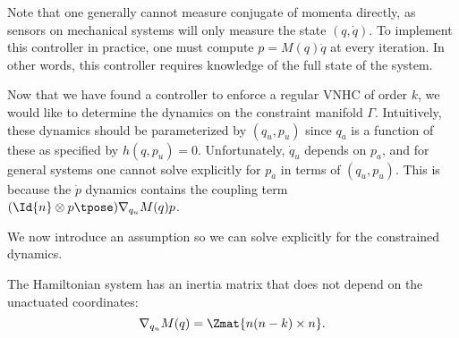 Note that one generally cannot measure conjugate of momenta directly, as sensors
on mechanical systems will only measure the state \((q,\dot{q})\). To
implement this controller in practice, one must compute \(p = M(q)\dot{q}\) at
every iteration. In other words, this controller requires knowledge of the full
state of the system.


Now that we have found a controller to enforce a regular VNHC of order \(k\), we
would like to determine the dynamics on the constraint manifold \(\Gamma\). 
Intuitively, these dynamics should be parameterized by \((q_u, p_u)\) since
\(q_a\) is a function of these as specified by \(h(q,p_u) = 0\).
Unfortunately, \(\dot{q}_u\) depends on \(p_a\), and for general systems one
cannot solve explicitly for \(p_a\) in terms of \((q_u,p_u)\). 
This is because the \(\dot{p}\) dynamics contains the coupling term 
\((\Id{n} \otimes p\tpose)\nabla_{q_u}M(q)p\). 

We now introduce an assumption so we can solve explicitly for the constrained
dynamics.

\begin{assm}\label{assm:inertially-actuated}
    The Hamiltonian system has an inertia matrix that does not depend on the
    unactuated coordinates:
    \[
        \nabla_{q_u}M(q) = \Zmat{n(n-k) \times n}
        .
    \]
\end{assm}

